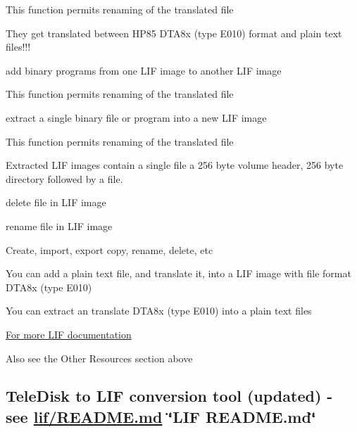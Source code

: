 \begin{DoxyItemize}
\begin{DoxyItemize}
\begin{DoxyItemize}
\item This function permits renaming of the translated file
\item They get translated between H\+P85 D\+T\+A8x (type E010) format and plain text files!!!
\end{DoxyItemize}
\item add binary programs from one L\+IF image to another L\+IF image
\begin{DoxyItemize}
\item This function permits renaming of the translated file
\end{DoxyItemize}
\item extract a single binary file or program into a new L\+IF image
\begin{DoxyItemize}
\item This function permits renaming of the translated file
\item Extracted L\+IF images contain a single file a 256 byte volume header, 256 byte directory followed by a file.
\end{DoxyItemize}
\item delete file in L\+IF image
\item rename file in L\+IF image
\item Create, import, export copy, rename, delete, etc
\begin{DoxyItemize}
\item You can add a plain text file, and translate it, into a L\+IF image with file format D\+T\+A8x (type E010)
\item You can extract an translate D\+T\+A8x (type E010) into a plain text files
\end{DoxyItemize}
\item \hyperlink{md_lif_README}{For more L\+IF documentation}
\item Also see the Other Resources section above
\end{DoxyItemize}
\end{DoxyItemize}

\subsection*{Tele\+Disk to L\+IF conversion tool (updated) -\/ see  \hyperlink{lif_2README_8md}{lif/\+R\+E\+A\+D\+M\+E.\+md} \char`\"{}\+L\+I\+F R\+E\+A\+D\+M\+E.\+md\char`\"{}}


